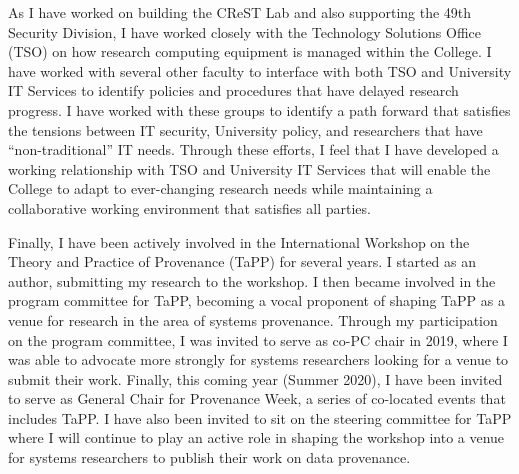 As I have worked on building the CReST Lab and also supporting the 49th Security Division, I have worked closely with the Technology Solutions Office (TSO) on how research computing equipment is managed within the College. I have worked with several other faculty to interface with both TSO and University IT Services to identify policies and procedures that have delayed research progress. I have worked with these groups to identify a path forward that satisfies the tensions between IT security, University policy, and researchers that have ``non-traditional'' IT needs. Through these efforts, I feel that I have developed a working relationship with TSO and University IT Services that will enable the College to adapt to ever-changing research needs while maintaining a collaborative working environment that satisfies all parties.

Finally, I have been actively involved in the International Workshop on the Theory and Practice of Provenance (TaPP) for several years. I started as an author, submitting my research to the workshop. I then became involved in the program committee for TaPP, becoming a vocal proponent of shaping TaPP as a venue for research in the area of systems provenance. Through my participation on the program committee, I was invited to serve as co-PC chair in 2019, where I was able to advocate more strongly for systems researchers looking for a venue to submit their work. Finally, this coming year (Summer 2020), I have been invited to serve as General Chair for Provenance Week, a series of co-located events that includes TaPP. I have also been invited to sit on the steering committee for TaPP where I will continue to play an active role in shaping the workshop into a venue for systems researchers to publish their work on data provenance.
